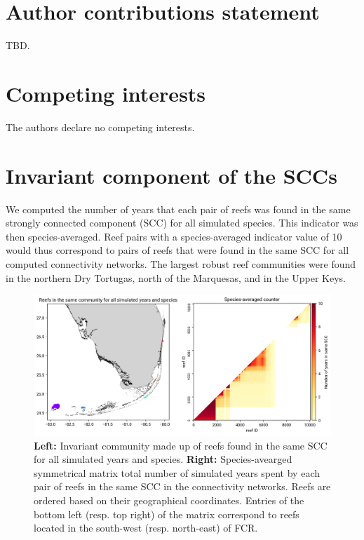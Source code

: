 \documentclass[preprint,12pt,authoryear]{elsarticle}
\begin{document}
	\section*{Author contributions statement}
	
	TBD.
	
	\section*{Competing interests}
	
	The authors declare no competing interests.
	
	
	
	
	\newpage
	
	
	\appendix
	\setcounter{figure}{0}
	\setcounter{table}{0}
	
	\section{Invariant component of the SCCs}
	
	We computed the number of years that each pair of reefs was found in the same strongly connected component (SCC) for all simulated species. This indicator was then species-averaged. Reef pairs with a species-averaged indicator value of 10 would thus correspond to pairs of reefs that were found in the same SCC for all computed connectivity networks. The largest robust reef communities were found in the northern Dry Tortugas, north of the Marquesas, and in the Upper Keys.
	
	\begin{figure}[h!]
		\centering
		\includegraphics[width=\textwidth]{figures/mean_counter.png}
		\caption{\textbf{Left:} Invariant community made up of reefs found in the same SCC for all simulated years and species. \textbf{Right:} Species-avearged symmetrical matrix total number of simulated years spent by each pair of reefs in the same SCC in the connectivity networks. Reefs are ordered based on their geographical coordinates. Entries of the bottom left (resp. top right) of the matrix correspond to reefs located in the south-west (resp. north-east) of FCR.}\label{fig:mean_counter}
	\end{figure}
	
\end{document}
